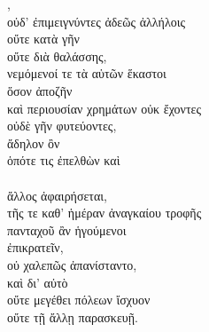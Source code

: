 {\large
\begin{greek}
\noindent {}, \\
οὐδ’ ἐπιμειγνύντες ἀδεῶς ἀλλήλοις \\
\tabto{2em} οὔτε κατὰ γῆν \\
\tabto{2em} οὔτε διὰ θαλάσσης, \\
νεμόμενοί τε τὰ αὑτῶν ἕκαστοι \\
\tabto{2em} ὅσον ἀποζῆν \\
καὶ περιουσίαν χρημάτων οὐκ ἔχοντες \\
οὐδὲ γῆν φυτεύοντες, \\
ἄδηλον ὂν \\
\tabto{2em} ὁπότε τις ἐπελθὼν καὶ \\
\tabto{4em}  \\
\tabto{2em} ἄλλος ἀφαιρήσεται, \\
τῆς τε καθ’ ἡμέραν ἀναγκαίου τροφῆς \\
\tabto{2em} πανταχοῦ ἂν ἡγούμενοι \\
\tabto{4em} ἐπικρατεῖν, \\
οὐ χαλεπῶς ἀπανίσταντο, \\
καὶ δι’ αὐτὸ \\
\tabto{2em} οὔτε μεγέθει πόλεων ἴσχυον \\
\tabto{2em} οὔτε τῇ ἄλλῃ παρασκευῇ. \\

\end{greek}
}

